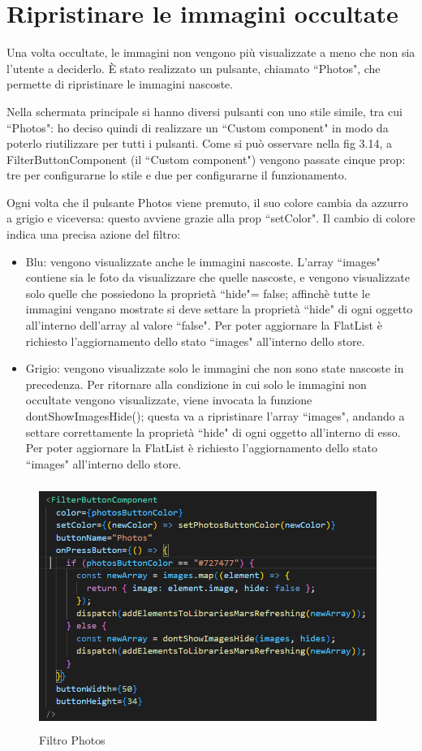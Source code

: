 \section{Ripristinare le immagini occultate}
Una volta occultate, le immagini non vengono pi\`u visualizzate a meno che non sia l'utente a deciderlo. \`E stato realizzato un pulsante, chiamato ``Photos", che permette di ripristinare le immagini nascoste.

Nella schermata principale si hanno diversi pulsanti con uno stile simile, tra cui ``Photos": ho deciso quindi di realizzare un ``Custom component" in modo da poterlo riutilizzare per tutti i pulsanti.
Come si pu\`o osservare nella fig 3.14, a FilterButtonComponent {}(il ``Custom component") vengono passate cinque prop: tre per configurarne lo stile e due per configurarne il funzionamento.

Ogni volta che il pulsante Photos viene premuto, il suo colore cambia da azzurro a grigio e viceversa: questo avviene grazie alla prop ``setColor". 
Il cambio di colore indica una precisa azione del filtro:
\begin{itemize}
    \item Blu: vengono visualizzate anche le immagini nascoste. L'array ``images" contiene sia le foto da visualizzare che quelle nascoste, e vengono visualizzate solo quelle che possiedono la propriet\`a ``hide"= false; affinch\`e tutte le immagini vengano mostrate si deve settare la propriet\`a ``hide" 
          di ogni oggetto all'interno dell'array al valore ``false". Per poter aggiornare la FlatList \`e richiesto l'aggiornamento dello stato ``images" all'interno dello store.
    \item Grigio: vengono visualizzate solo le immagini che non sono state nascoste in precedenza.
        Per ritornare alla condizione in cui solo le immagini non occultate vengono visualizzate, viene invocata la funzione dontShowImagesHide(); questa va a ripristinare l'array ``images", andando a settare correttamente la propriet\`a ``hide" di ogni oggetto all'interno di esso.
        Per poter aggiornare la FlatList \`e richiesto l'aggiornamento dello stato ``images" all'interno dello store.
\end{itemize}

\begin{figure}[h]
    \centering
    \includegraphics[width=11cm, height=8cm]{images/photoButton.png}
    \caption[differenzeiteot]{Filtro Photos}
    \label{fig:photoButton}
\end{figure}
